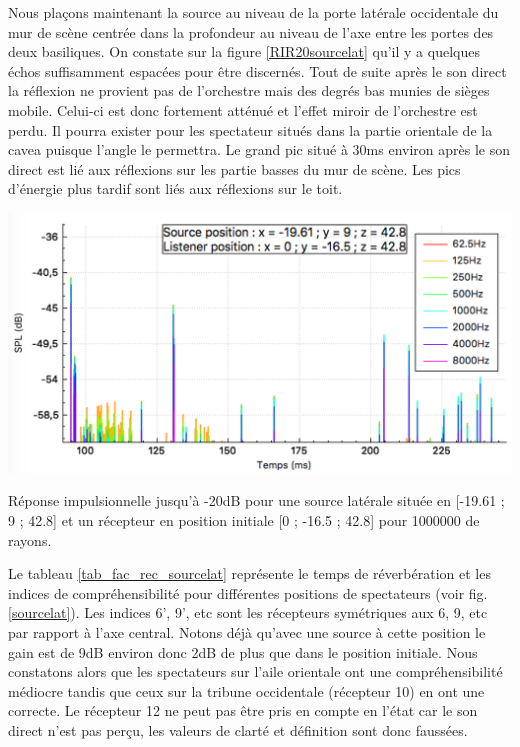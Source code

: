 Nous plaçons maintenant la source au niveau de la porte latérale occidentale du mur de scène centrée dans la profondeur au niveau de l'axe entre les portes des deux \glspl{basilique}. On constate sur la figure \ref{RIR20sourcelat} qu'il y a quelques échos suffisamment espacées pour être discernés. Tout de suite après le son direct la réflexion ne provient pas de l'orchestre mais des degrés bas munies de sièges mobile. Celui-ci est donc fortement atténué et l'effet miroir de l'orchestre est perdu. Il pourra exister pour les spectateur situés dans la partie orientale de la \gls{cavea} puisque l'angle le permettra. Le grand pic situé à 30ms environ après le son direct est lié aux réflexions sur les partie basses du mur de scène. Les pics d'énergie plus tardif sont liés aux réflexions sur le toit.
%
\begin{figureth}
	\includegraphics[width=0.7\linewidth]{images/RIR20sourcelat}
	\caption{Réponse impulsionnelle jusqu'à -20dB pour une source latérale située en [-19.61 ; 9 ; 42.8] et un récepteur en position initiale [0 ; -16.5 ; 42.8] pour 1000000 de rayons.}
	\label{RIR20sourcelat}
\end{figureth}
%
Le tableau \ref{tab_fac_rec_sourcelat} représente le temps de réverbération et les indices de compréhensibilité pour différentes positions de spectateurs (voir fig. \ref{sourcelat}). Les indices 6', 9', etc sont les récepteurs symétriques aux 6, 9, etc par rapport à l'axe central. Notons déjà qu'avec une source à cette position le gain est de 9dB environ donc 2dB de plus que dans le position initiale. Nous constatons alors que les spectateurs sur l'aile orientale ont une compréhensibilité médiocre tandis que ceux sur la tribune occidentale (récepteur 10) en ont une correcte. Le récepteur 12 ne peut pas être pris en compte en l'état car le son direct n'est pas perçu, les valeurs de clarté et définition sont donc faussées.

